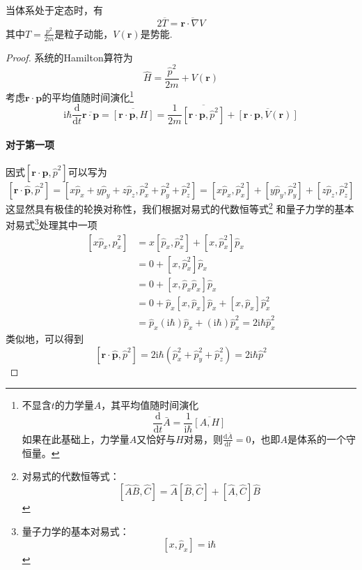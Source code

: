 \begin{theorem}[Virial定理]
    当体系处于定态时，有
    $$
        2\overline{T} = \overline{\boldsymbol{r} \cdot \nabla V}
    $$
    其中$T=\frac{p^2}{2m}$是粒子动能，$V\left(\boldsymbol{r}\right)$是势能.
\end{theorem}
\begin{proof}
    系统的Hamilton算符为
    $$
        \hat{H}=\frac{\hat{p}^2}{2m}+V(\boldsymbol{r})
    $$
    考虑$\boldsymbol{r}\cdot\boldsymbol{p}$的平均值随时间演化\footnote{不显含$t$的力学量$A$，其平均值随时间演化
        $$
            \frac{\mathrm{d}}{\mathrm{d}t}\bar{A}=\frac{1}{\mathrm{i}\hbar}\overline{\left[A, H\right]}
        $$
        如果在此基础上，力学量$A$又恰好与$H$对易，则$\frac{\mathrm{d}\bar{A}}{\mathrm{d}t}=0$，也即$A$是体系的一个守恒量。
    }
    $$
        \mathrm{i}\hbar\frac{\mathrm{d}}{\mathrm{d}t}\overline{\boldsymbol{r}\cdot\boldsymbol{p}}
        =\overline{\left[\boldsymbol{r}\cdot\boldsymbol{p}, H\right]}
        =\frac{1}{2m}\overline{\left[\boldsymbol{r}\cdot\boldsymbol{p}, \hat{p}^2\right]}+\overline{\left[\boldsymbol{r}\cdot\boldsymbol{p}, V(\boldsymbol{r})\right]}
    $$
    \paragraph{对于第一项}
    因式$\left[\boldsymbol{r}\cdot\boldsymbol{p}, \hat{p}^2\right]$可以写为
    $$
        \left[\boldsymbol{r}\cdot\hat{\boldsymbol{p}}, \hat{p}^2\right]
        =\left[x\hat{p}_x + y\hat{p}_y + z\hat{p}_z, \hat{p}_x^2+\hat{p}_y^2+\hat{p}_z^2\right]
        =\left[x\hat{p}_x, \hat{p}_x^2\right] + \left[y\hat{p}_y, \hat{p}_y^2\right] + \left[z\hat{p}_z, \hat{p}_z^2\right]
    $$
    这显然具有极佳的轮换对称性，我们根据对易式的代数恒等式\footnote{
        对易式的代数恒等式：$$\left[\hat{A}\hat{B}, \hat{C}\right]=\hat{A}\left[\hat{B}, \hat{C}\right]+\left[\hat{A}, \hat{C}\right]\hat{B}$$
    }
    和量子力学的基本对易式\footnote{
        量子力学的基本对易式：$$[x, \hat{p}_x]=\mathrm{i}\hbar$$
    }处理其中一项
    $$
        \begin{aligned}
            \left[x\hat{p}_x, \hat{p}_x^2\right]
             & =x\left[\hat{p}_x, \hat{p}_x^2\right] + \left[x, \hat{p}_x^2\right]\hat{p}_x                   \\
             & =0 + \left[x, \hat{p}_x^2\right]\hat{p}_x                                                      \\
             & =0 + \left[x, \hat{p}_x\hat{p}_x\right]\hat{p}_x                                               \\
             & =0 + \hat{p}_x\left[x, \hat{p}_x\right]\hat{p}_x + \left[x, \hat{p}_x\right]\hat{p}_x^2        \\
             & = \hat{p}_x(\mathrm{i}\hbar)\hat{p}_x+(\mathrm{i}\hbar)\hat{p}_x^2=2\mathrm{i}\hbar\hat{p}_x^2
        \end{aligned}
    $$
    类似地，可以得到
    $$
        \left[\boldsymbol{r}\cdot\hat{\boldsymbol{p}}, \hat{p}^2\right] = 2\mathrm{i}\hbar\left(\hat{p}_x^2 + \hat{p}_y^2 + \hat{p}_z^2\right)= 2\mathrm{i}\hbar\hat{p}^2
    $$

\end{proof}
